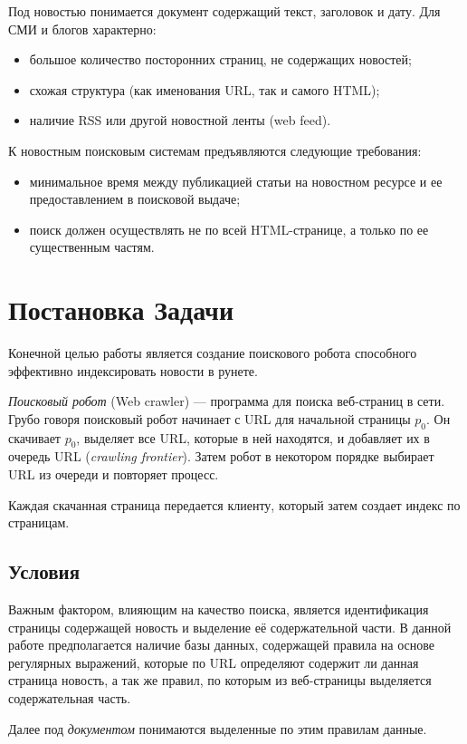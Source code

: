 Под новостью понимается документ содержащий текст, заголовок и дату. Для СМИ и
блогов характерно:
\begin{itemize} 
 \item большое количество посторонних страниц, не содержащих новостей;
 \item схожая структура (как именования URL, так и самого HTML);
 \item наличие RSS или другой новостной ленты (web feed).
\end{itemize}

К новостным поисковым системам предъявляются следующие требования:
\begin{itemize} 
\item минимальное время между публикацией статьи на новостном ресурсе и ее 
    предоставлением в поисковой выдаче;
\item поиск должен осуществлять не по всей HTML-странице, а только по ее 
    существенным частям. 
\end{itemize}

\chapter{Постановка Задачи}
Конечной целью работы является создание поискового робота способного эффективно индексировать новости в рунете.

\textit{Поисковый робот} (Web crawler) --- программа для поиска веб-страниц в сети\cite{crawl}. Грубо говоря поисковый робот начинает с URL для начальной страницы $p_{0}$.
 Он скачивает $p_{0}$, выделяет все URL, которые в ней находятся, и добавляет их в очередь URL (\textit{crawling frontier}). Затем робот в некотором порядке выбирает URL из очереди и повторяет процесс.

Каждая скачанная страница передается клиенту, который затем создает индекс по страницам.
\section{Условия}
Важным фактором, влияющим на качество поиска, является идентификация страницы содержащей новость
 и выделение её содержательной части. В данной работе предполагается наличие базы данных,
 содержащей правила на основе регулярных выражений, которые по URL определяют содержит ли данная страница новость,
 а так же правил, по которым из веб-страницы выделяется содержательная часть.

Далее под \textit{документом} понимаются выделенные по этим правилам данные.

